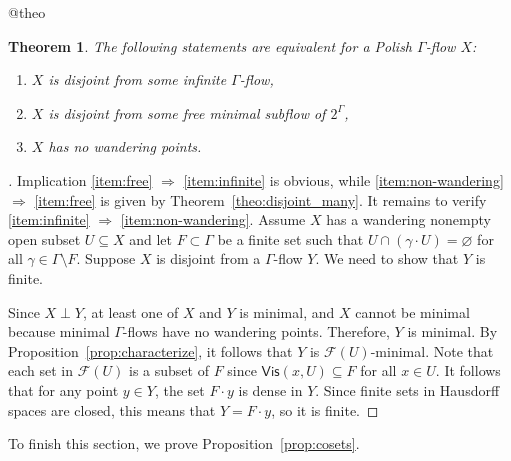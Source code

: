 \documentclass[11pt,reqno,psamsfonts]{amsart}
\makeatletter
\theoremstyle{bfnote}
\newtheorem{theo}{Theorem}[section]
\theoremstyle{definition}
\theoremstyle{remark}
\newcommand{\neutralize}[1]{\expandafter\let\csname c@#1\endcsname\count@}
\newenvironment{theocopy}[1]
{\renewcommand{\thetheo}{\ref{#1}}%
	\neutralize{theo}\phantomsection
	\begin{theo}}
	{\end{theo}}
\newcommand{\0}{\varnothing}
\newcommand{\bemph}[1]{{\normalfont#1}}
\newcommand{\ep}[1]{\bemph{(}#1\bemph{)}}
\newcommand{\G}{\Gamma}
\newcommand{\Vis}{\mathsf{Vis}}
\numberwithin{equation}{section}
\newenvironment{scproof}[1][]{\begin{proof}[\textsc{\upshape{Proof}}#1]}{\end{proof}}
\makeatother
\begin{document}
    \begin{theocopy}{theo:disjoint_one}
        The following statements are equivalent for a Polish $\G$-flow $X$:
        \begin{enumerate}[label=\ep{\normalfont\arabic*}]
            \item\label{item:infinite} $X$ is disjoint from some infinite $\G$-flow,
            \item\label{item:free} $X$ is disjoint from some free minimal subflow of $2^\G$,
            \item\label{item:non-wandering} $X$ has no wandering points.
        \end{enumerate}
    \end{theocopy}
    \begin{scproof}
        Implication \ref{item:free} $\Longrightarrow$ \ref{item:infinite} is obvious, while \ref{item:non-wandering} $\Longrightarrow$ \ref{item:free} is given by Theorem~\ref{theo:disjoint_many}. It remains to verify \ref{item:infinite} $\Longrightarrow$ \ref{item:non-wandering}. Assume $X$ has a wandering nonempty open subset $U \subseteq X$ and let $F \subset \G$ be a finite set such that $U \cap (\gamma \cdot U) = \0$ for all $\gamma \in \G \setminus F$. Suppose $X$ is disjoint from a $\G$-flow $Y$. We need to show that $Y$ is finite.
        
        Since $X \perp Y$, at least one of $X$ and $Y$ is minimal, and $X$ cannot be minimal because minimal $\G$-flows have no wandering points. %
        Therefore, $Y$ is minimal. By Proposition~\ref{prop:characterize}, it follows that $Y$ is $\mathcal{F}(U)$-minimal. Note that each set in $\mathcal{F}(U)$ is a subset of $F$ since $\Vis(x,U) \subseteq F$ for all $x \in U$. It follows that for any point $y \in Y$, the set $F \cdot y$ is dense in $Y$. Since finite sets in Hausdorff spaces are closed, this means that $Y = F \cdot y$, so it is finite.
    \end{scproof}

    To finish this section, we prove Proposition~\ref{prop:cosets}.
\end{document}
